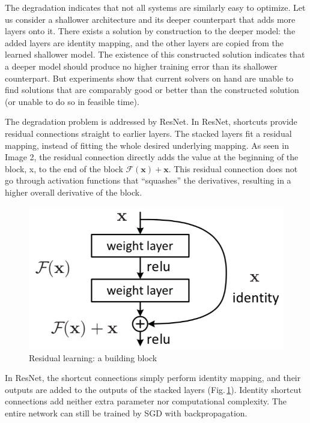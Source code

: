 The degradation indicates that not all systems are similarly easy to optimize. Let us consider a shallower architecture and its deeper counterpart that adds more layers onto it. There exists a solution by construction to the deeper model: the added layers are identity mapping, and the other layers are copied from the learned shallower model. The existence of this constructed solution indicates that a deeper model should produce no higher training error than its shallower counterpart. But experiments show that current solvers on hand are unable to find solutions that are comparably good or better than the constructed solution (or unable to do so in feasible time). 

The degradation problem is addressed by ResNet. In ResNet, shortcuts provide residual connections straight to earlier layers. The stacked layers fit a residual mapping, instead of fitting the whole desired underlying mapping. As seen in Image 2, the residual connection directly adds the value at the beginning of the block, x, to the end of the block $\mathcal{F}(\mathbf{x})+\mathbf{x}$. This residual connection does not go through activation functions that “squashes” the derivatives, resulting in a higher overall derivative of the block.

\begin{figure}[h]
	\centering
	\includegraphics[scale=0.5]{Figs/residualblock.png}
    \caption{Residual learning: a building block \cite{resnet}}
    \label{residualblock}
\end{figure}

In ResNet, the shortcut connections simply perform identity mapping, and their outputs are added to the outputs of the stacked layers (Fig.\,\ref{residualblock}). Identity shortcut connections add neither extra parameter nor computational complexity. The entire network can still be trained by SGD with backpropagation.

